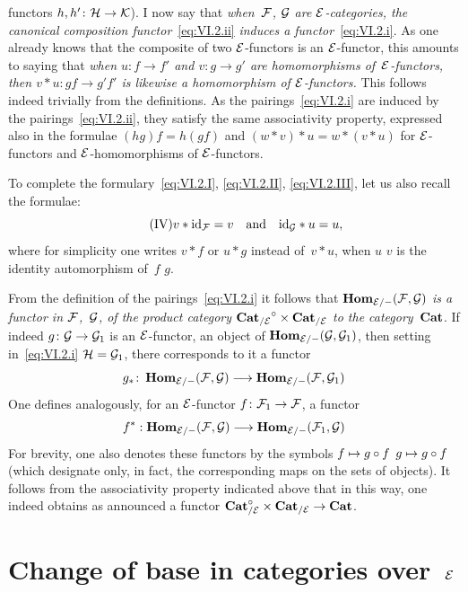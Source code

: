functors $h,h'\colon \cal{H}\to\cal{K}$). I now say that
\emph{when~$\cal{F}$, $\cal{G}$ are $\cal{E}$-categories,
the canonical composition functor}~\eqref{eq:VI.2.ii} \emph{induces a
functor}~\eqref{eq:VI.2.i}. As one already knows that the
composite of two $\cal{E}$-functors is an $\cal{E}$-functor,
this amounts to saying that \emph{when $u\colon f\to f'$ and
$v\colon g\to g'$ are homomorphisms of~$\cal{E}$-functors,
then $v*u\colon gf\to g'f'$ is likewise a homomorphism of
$\cal{E}$-functors.} This follows indeed trivially from the
definitions. As the pairings~\eqref{eq:VI.2.i} are
induced by the pairings~\eqref{eq:VI.2.ii}, they satisfy the
same associativity property, expressed also
in the formulae $(hg)f=h(gf)$ and $(w*v)*u=w*(v*u)$ for
$\cal{E}$-functors and $\cal{E}$-homomorphisms of
$\cal{E}$-functors.

To complete the formulary~\eqref{eq:VI.2.I},
\eqref{eq:VI.2.II}, \eqref{eq:VI.2.III}, let us also recall the formulae:
\begin{equation*}
\tag{IV}
\label{eq:VI.2.IV} {v*\id_{\cal{F}}=v\quad\text{and}\quad\id_{\cal{G}}*u=u}\quoi,
\end{equation*}
where
for simplicity one writes $v*f$ or $u*g$ instead of~$v*u$, when
$u$ \resp $v$ is the identity automorphism of~$f$ \resp $g$.

From the definition of the pairings~\eqref{eq:VI.2.i} it follows
that $\SheafHom_{\cal{E}/-}(\cal{F},\cal{G})$ \emph{is a functor in
$\cal{F}$,~$\cal{G}$,
of the product category
${\Cat_{/\cal{E}}}^\circ\times\Cat_{/\cal{E}}$ to the
category~$\Cat$}. If indeed $g\colon \cal{G}\to\cal{G}_1$ is
an $\cal{E}$-functor, \ie an object of
$\SheafHom_{\cal{E}/-}(\cal{G},\cal{G}_1)$, then setting
in~\eqref{eq:VI.2.i} $\cal{H}=\cal{G}_1$, there corresponds to it a
functor
$$
g_*\colon\SheafHom_{\cal{E}/-}(\cal{F},\cal{G})\to
\SheafHom_{\cal{E}/-}(\cal{F},\cal{G}_1)
$$
One defines analogously, for an $\cal{E}$-functor
$f\colon \cal{F}_1\to \cal{F}$, a functor
$$
f^*:\SheafHom_{\cal{E}/-}(\cal{F},\cal{G})\to
\SheafHom_{\cal{E}/-}(\cal{F}_1,\cal{G})
$$
For brevity, one also denotes these functors by the symbols
$f\mto g\circ f$ \resp $g\mto g\circ f$ (which designate
only, in fact, the corresponding maps on the sets
of objects). It follows from the associativity property
indicated above that in this way, one indeed obtains as
announced a functor
$\Cat_{/\cal{E}}^\circ\times\Cat_{/\cal{E}}\to\Cat$.

\section{Change of base in categories over~$\cal{E}$}
\label{VI.3}

